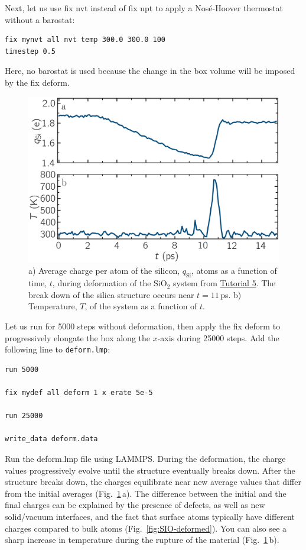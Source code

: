 \documentclass[9pt,tutorial]{livecoms}
\newcommand{\lmpcmd}[1]{\hspace{0pt}\colorbox{listing}{\textcolor{command}{\small{#1}}}\hspace{0pt}} %
\newcommand{\flecmd}[1]{\textcolor{command}{\texttt{#1}}} %
\begin{document}
Next, let us use \lmpcmd{fix nvt} instead of \lmpcmd{fix npt} to apply a
Nosé-Hoover thermostat without a barostat:
\begin{lstlisting}
fix mynvt all nvt temp 300.0 300.0 100
timestep 0.5
\end{lstlisting}
Here, no barostat is used because the change in the box volume will be imposed
by the \lmpcmd{fix deform}.

\begin{figure}
\includegraphics[width=\linewidth]{SIO-deformed-charge}
\caption{a) Average charge per atom of the silicon, $q_\text{Si}$, atoms as
a function of time, $t$, during deformation of the $\text{SiO}_2$ system
from \hyperref[reactive-silicon-dioxide-label]{Tutorial 5}. The break down of the
silica structure occurs near $t = 11$\,ps.  b) Temperature, $T$, of the
system as a function of $t$.}
\label{fig:SIO-deformed-charge}
\end{figure}

Let us run for 5000 steps without deformation, then apply the \lmpcmd{fix deform}
to progressively elongate the box along the $x$-axis during 25000 steps.  Add
the following line to \flecmd{deform.lmp}:
\begin{lstlisting}
run 5000

fix mydef all deform 1 x erate 5e-5

run 25000

write_data deform.data
\end{lstlisting}
Run the \lmpcmd{deform.lmp} file using LAMMPS.  During the deformation, the charge
values progressively evolve until the structure eventually breaks down.  After the
structure breaks down, the charges equilibrate near new average values that differ
from the initial averages (Fig.~\ref{fig:SIO-deformed-charge}\,a).  The difference
between the initial and the final charges can be explained by the presence of
defects, as well as new solid/vacuum interfaces, and the fact that surface atoms
typically have different charges compared to bulk atoms (Fig.~\ref{fig:SIO-deformed}).
You can also see a sharp increase in temperature during the rupture of
the material (Fig.~\ref{fig:SIO-deformed-charge}\,b).
\end{document}
